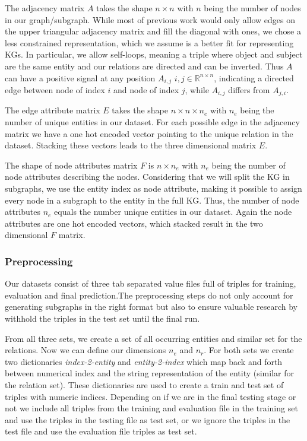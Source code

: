 The adjacency matrix $A$ takes the shape $n\times n$ with $n$ being the number of nodes in our graph/subgraph. While most of previous work would only allow edges on the upper triangular adjacency matrix and fill the diagonal with ones, we chose a less constrained representation, which we assume is a better fit for representing KGs. In particular, we allow self-loops, meaning a triple where object and subject are the same entity and our relations are directed and can be inverted. Thus $A$ can have a positive signal at any position $A_{i,j}$  $i,j \in \mathbb{R}^{n \times n}$, indicating a directed edge between node of index $i$ and node of index $j$, while $A_{i,j}$ differs from $A_{j,i}$.

The edge attribute matrix $E$ takes the shape $n\times n\times n_e$ with $n_e$ being the number of unique entities in our dataset. For each possible edge in the adjacency matrix we have a one hot encoded vector pointing to the unique relation in the dataset. Stacking these vectors leads to the three dimensional matrix $E$.

The shape of node attributes matrix $F$ is $n\times n_e$ with $n_e$ being the number of node attributes describing the nodes. Considering that we will split the KG in subgraphs, we use the entity index as node attribute, making it possible to assign every node in a subgraph to the entity in the full KG. Thus, the number of node attributes $n_e$ equals the number unique entities in our dataset. Again the node attributes are one hot encoded vectors, which stacked result in the two dimensional $F$ matrix.


\subsubsection{Preprocessing}
Our datasets consist of three tab separated value files full of triples for training, evaluation and final prediction.The preprocessing steps do not only account for generating subgraphs in the right format but also to ensure valuable research by withhold the triples in the test set until the final run.

From all three sets, we create a set of all occurring entities and similar set for the relations. Now we can define our dimensions $n_e$ and $n_r$. For both sets we create two dictionaries \textit{index-2-entity} and \textit{entity-2-index}  which map back and forth between numerical index and the string representation of the entity (similar for the relation set). These dictionaries are used to create a train and test set of triples with numeric indices. Depending on if we are in the final testing stage or not we include all triples from the training and evaluation file in the training set and use the triples in the testing file as test set, or we ignore the triples in the test file and use the evaluation file triples as test set.

